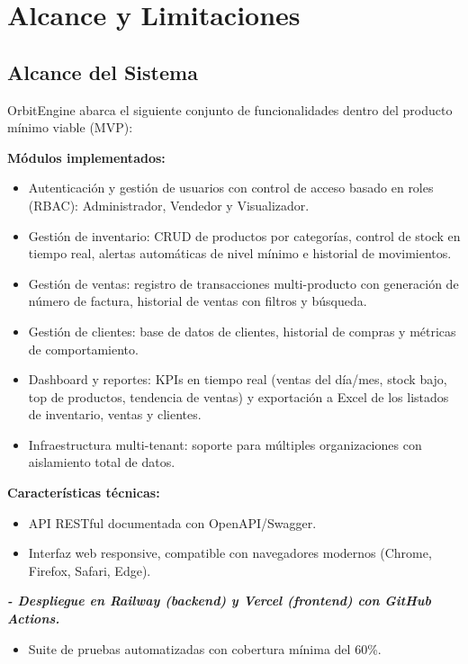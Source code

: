 \section{Alcance y Limitaciones}\label{alcance-y-limitaciones}

\subsection{Alcance del Sistema}\label{alcance-del-sistema}

OrbitEngine abarca el siguiente conjunto de funcionalidades dentro del producto mínimo viable (MVP):

\textbf{Módulos implementados:}

\begin{itemize}
\tightlist
\item
  Autenticación y gestión de usuarios con control de acceso basado en roles (RBAC): Administrador, Vendedor y Visualizador.
\item
  Gestión de inventario: CRUD de productos por categorías, control de stock en tiempo real, alertas automáticas de nivel mínimo e historial de movimientos.
\item
  Gestión de ventas: registro de transacciones multi-producto con generación de número de factura, historial de ventas con filtros y búsqueda.
\item
  Gestión de clientes: base de datos de clientes, historial de compras y métricas de comportamiento.
\item
  Dashboard y reportes: KPIs en tiempo real (ventas del día/mes, stock bajo, top de productos, tendencia de ventas) y exportación a Excel de los listados de inventario, ventas y clientes.
\item
  Infraestructura multi-tenant: soporte para múltiples organizaciones con aislamiento total de datos.
\end{itemize}

\textbf{Características técnicas:}

\begin{itemize}
\tightlist
\item
  API RESTful documentada con OpenAPI/Swagger.
\item
  Interfaz web responsive, compatible con navegadores modernos (Chrome, Firefox, Safari, Edge).
\end{itemize}

\textbf{\emph{- Despliegue en Railway (backend) y Vercel (frontend) con GitHub Actions.}}

\begin{itemize}
\tightlist
\item
  Suite de pruebas automatizadas con cobertura mínima del 60\%.
\end{itemize}

